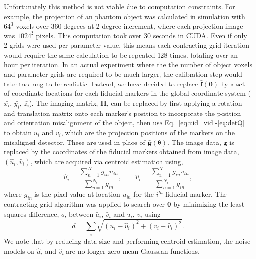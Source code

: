 Unfortunately this method is not viable due to computation constraints.  For example, the projection of an phantom object was calculated in simulation with $64^3$ voxels over 360 degrees at 2-degree increment, where each projection image was $1024^2$ pixels.  This computation took over 30 seconds in CUDA.  Even if only 2 grids were used per parameter value, this means each contracting-grid iteration would require the same calculation to be repeated 128 times, totaling over an hour per iteration.  In an actual experiment where the the number of object voxels and parameter grids are required to be much larger, the calibration step would take too long to be realistic.  Instead, we have decided to replace $\mathrm{\mathbf{\bar{f}}}( \boldsymbol{\theta})$ by a set of coordinate locations for each fiducial markers in the global coordinate system ($\bar{x_i}$, $\bar{y_i}$, $\bar{z_i}$).  The imaging matrix, $\mathrm{\mathbf{H}}$, can be replaced by first applying a rotation and translation matrix onto each marker's position to incorporate the position and orientation misalignment of the object, then use Eq.~\ref{eq:uid_vid}-\ref{eq:detQ} to obtain $\bar{u}_i$ and $\bar{v}_i$, which are the projection positions of the markers on the misaligned detector.  These are used in place of $\mathrm{\mathbf{\bar{g}}}( \boldsymbol{\theta})$.  The image data, $\mathrm{\mathbf{g}}$ is replaced by the coordinates of the fiducial markers obtained from image data, $(\hat{u}_i, \hat{v}_i)$, which are acquired via centroid estimation using,
%
\begin{equation}
\hat{u}_i = \frac{\sum\limits_{n = 1}^{N} g_{in} u_{in}}{\sum\limits_{n = 1}^{N_i} g_{in}}, \qquad
\hat{v}_i = \frac{\sum\limits_{n = 1}^{N} g_{in} v_{in}}{\sum\limits_{n = 1}^{N_i} g_{in}},
\end{equation}
\label{eq:centroid_estimation}
%
where $g_{in}$ is the pixel value at location $u_{in}$ for the $i^{th}$ fiducial marker.  The contracting-grid algorithm was applied to search over $\boldsymbol{\theta}$ by minimizing the least-squares difference, $d$, between $\bar{u}_i$, $\bar{v}_i$ and $u_i$, $v_i$ using
%
\begin{equation}
d = \sum\limits_i \sqrt{ ( \bar{u_i} - \hat{u}_i )^2 + ( \bar{v_i} - \hat{v}_i)^2 }.
\end{equation}
%
We note that by reducing data size and performing centroid estimation, the noise models on $\hat{u}_i$ and $\hat{v}_i$ are no longer zero-mean Gaussian functions.

